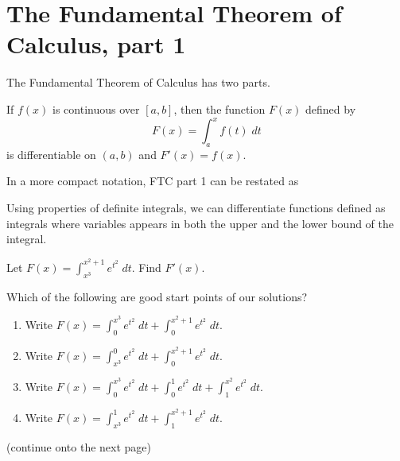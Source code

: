 \documentclass[../main.tex]{subfiles}
\begin{document}
 \section{The Fundamental Theorem of Calculus, part 1}
The Fundamental Theorem of Calculus has two parts.

\begin{mdframed}[style=withref-compact]
  If \(f(x)\) is continuous over \([a,b]\), then the function \(F(x)\) defined by
  \[
    F(x) = \int_{a}^{x} f(t) \;dt
  \]
  is differentiable on \((a,b)\) and \(F'(x) = f(x)\).

\end{mdframed}

In a more compact notation, FTC part 1 can be restated as 


Using properties of definite integrals, we can differentiate functions defined as integrals where variables appears in both the upper and the lower bound of the integral.
\begin{example} \label{ex:ftc-one}
  Let \(F(x) = \int_{x^{3}}^{x^{2} + 1} e^{t^{2}} \;dt\). Find \(F'(x)\).

  Which of the following are good start points of our solutions?
  \begin{enumerate}[label=(\alph*)]
    \item Write \(F(x) = \int_{0}^{x^{3}} e^{t^{2}} \;dt + \int_{0}^{x^{2}+1} e^{t^{2}} \;dt \).
    \item Write \(F(x) = \int_{x^{3}}^{0} e^{t^{2}} \;dt + \int_{0}^{x^{2}+1} e^{t^{2}} \;dt \).
    \item Write \(F(x) = \int_{0}^{x^{3}} e^{t^{2}} \;dt + \int_{0}^{1} e^{t^{2}} \;dt + \int_{1}^{x^{2}} e^{t^{2}} \;dt\).
    \item Write \(F(x) = \int_{x^{3}}^{1} e^{t^{2}} \;dt + \int_{1}^{x^{2}+1} e^{t^{2}} \;dt \).
  \end{enumerate}

  {\footnotesize (continue onto the next page)}

\end{example}
\end{document}

